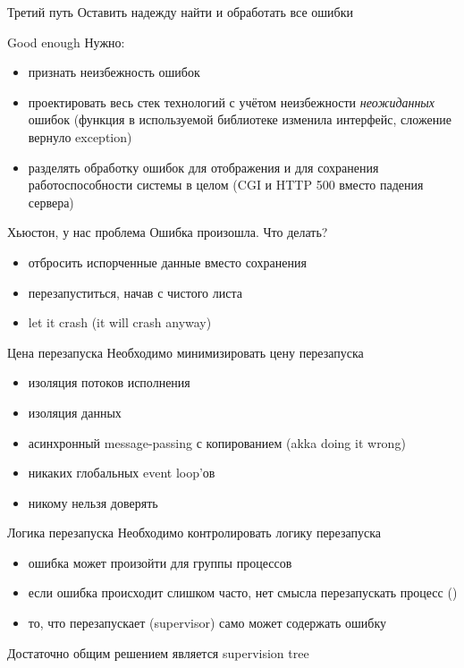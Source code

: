 \documentclass[10pt]{beamer}
\begin{document}
\begin{frame}{Третий путь}
  Оставить надежду найти и обработать все ошибки
\end{frame}

\begin{frame}{Good enough}
  Нужно:
  \begin{itemize}
  \item признать неизбежность ошибок
  \item проектировать весь стек технологий с учётом неизбежности \emph{неожиданных} ошибок (функция в используемой библиотеке изменила интерфейс, сложение вернуло exception)
  \item разделять обработку ошибок для отображения и для сохранения работоспособности системы в целом (CGI и HTTP 500 вместо падения сервера)
  \end{itemize}
\end{frame}

\begin{frame}{Хьюстон, у нас проблема}
  Ошибка произошла. Что делать?
  \begin{itemize}
  \item отбросить испорченные данные вместо сохранения
  \item перезапуститься, начав с чистого листа
  \item let it crash (it will crash anyway)
  \end{itemize}
\end{frame}

\begin{frame}{Цена перезапуска}
  Необходимо минимизировать цену перезапуска
  \begin{itemize}
  \item изоляция потоков исполнения
  \item изоляция данных
  \item асинхронный message-passing с копированием (akka doing it wrong)
  \item никаких глобальных event loop'ов
  \item никому нельзя доверять
  \end{itemize}
\end{frame}

\begin{frame}{Логика перезапуска}
  Необходимо контролировать логику перезапуска
  \begin{itemize}
  \item ошибка может произойти для группы процессов
  \item если ошибка происходит слишком часто, нет смысла перезапускать процесс ()
  \item то, что перезапускает (supervisor) само может содержать ошибку
  \end{itemize}
  Достаточно общим решением является supervision tree
\end{frame}
\end{document}
